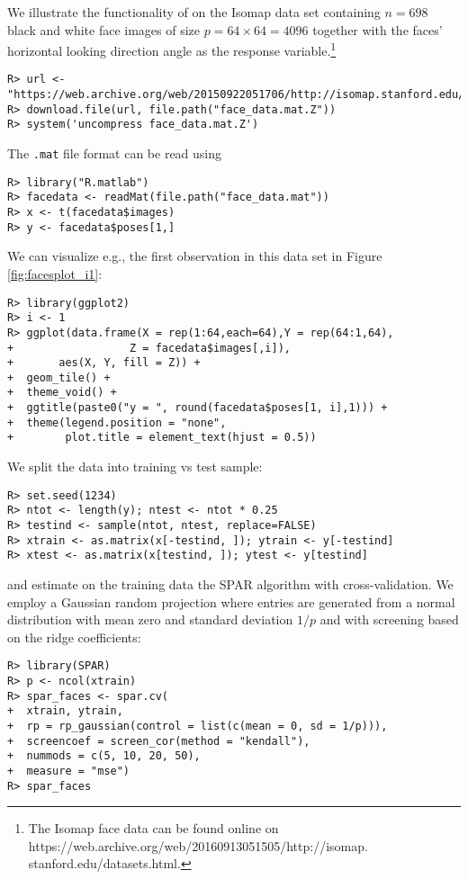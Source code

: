 \documentclass[
  article]{jss}
\begin{document}
We illustrate the functionality of  on the Isomap data set
containing \(n = 698\) black and white face images of size
\(p = 64 \times 64 = 4096\) together with the faces' horizontal looking
direction angle as the response variable.\footnote{
The Isomap face data can be found online on https://web.archive.org/web/20160913051505/http://isomap.
stanford.edu/datasets.html.}

\begin{verbatim}
R> url <- "https://web.archive.org/web/20150922051706/http://isomap.stanford.edu/face_data.mat.Z"
R> download.file(url, file.path("face_data.mat.Z"))
R> system('uncompress face_data.mat.Z')
\end{verbatim}

The \texttt{.mat} file format can be read using 
\citep{pkg:rmatlab}

\begin{verbatim}
R> library("R.matlab")
R> facedata <- readMat(file.path("face_data.mat"))
R> x <- t(facedata$images)
R> y <- facedata$poses[1,]
\end{verbatim}

We can visualize e.g., the first observation in this data set in Figure
\ref{fig:facesplot_i1}:

\begin{verbatim}
R> library(ggplot2)
R> i <- 1
R> ggplot(data.frame(X = rep(1:64,each=64),Y = rep(64:1,64),
+                  Z = facedata$images[,i]),
+       aes(X, Y, fill = Z)) +
+  geom_tile() +
+  theme_void() +
+  ggtitle(paste0("y = ", round(facedata$poses[1, i],1))) +
+  theme(legend.position = "none",
+        plot.title = element_text(hjust = 0.5))
\end{verbatim}

We split the data into training vs test sample:

\begin{verbatim}
R> set.seed(1234)
R> ntot <- length(y); ntest <- ntot * 0.25
R> testind <- sample(ntot, ntest, replace=FALSE)
R> xtrain <- as.matrix(x[-testind, ]); ytrain <- y[-testind]
R> xtest <- as.matrix(x[testind, ]); ytest <- y[testind]
\end{verbatim}

and estimate on the training data the SPAR algorithm with
cross-validation. We employ a Gaussian random projection where entries
are generated from a normal distribution with mean zero and standard
deviation \(1/p\) and with screening based on the ridge coefficients:

\begin{verbatim}
R> library(SPAR)
R> p <- ncol(xtrain)
R> spar_faces <- spar.cv(
+  xtrain, ytrain,
+  rp = rp_gaussian(control = list(c(mean = 0, sd = 1/p))),
+  screencoef = screen_cor(method = "kendall"),
+  nummods = c(5, 10, 20, 50),
+  measure = "mse")
R> spar_faces
\end{verbatim}
\end{document}
